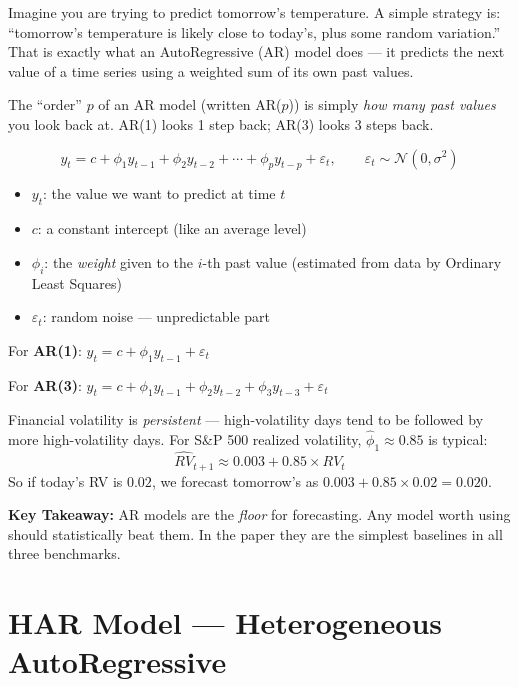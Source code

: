 \documentclass[11pt]{article}
\newcommand{\concept}[2]{%
  \begin{tcolorbox}[conceptbox, title={#1}]
  #2
  \end{tcolorbox}
}
\newcommand{\mathblock}[2]{%
  \begin{tcolorbox}[mathbox, title={Math: #1}]
  #2
  \end{tcolorbox}
}
\newcommand{\example}[2]{%
  \begin{tcolorbox}[examplebox, title={Concrete Example: #1}]
  #2
  \end{tcolorbox}
}
\newcommand{\keypoint}[1]{%
  \begin{tcolorbox}[keybox]
  \textbf{Key Takeaway:} #1
  \end{tcolorbox}
}
\begin{document}
\concept{What is an AutoRegressive Model?}{
Imagine you are trying to predict tomorrow's temperature. A simple strategy is:
``tomorrow's temperature is likely close to today's, plus some random variation.''
That is exactly what an AutoRegressive (AR) model does --- it predicts the next
value of a time series using a weighted sum of its own past values.

The ``order'' $p$ of an AR model (written AR($p$)) is simply \emph{how many
past values} you look back at. AR(1) looks 1 step back; AR(3) looks 3 steps
back.
}

\mathblock{AR($p$) Formula}{
\[
  y_t = c + \phi_1 y_{t-1} + \phi_2 y_{t-2} + \cdots + \phi_p y_{t-p}
        + \varepsilon_t, \qquad \varepsilon_t \sim \mathcal{N}(0, \sigma^2)
\]
\begin{itemize}
  \item $y_t$: the value we want to predict at time $t$
  \item $c$: a constant intercept (like an average level)
  \item $\phi_i$: the \emph{weight} given to the $i$-th past value
        (estimated from data by Ordinary Least Squares)
  \item $\varepsilon_t$: random noise --- unpredictable part
\end{itemize}

For \textbf{AR(1)}: $y_t = c + \phi_1 y_{t-1} + \varepsilon_t$

For \textbf{AR(3)}: $y_t = c + \phi_1 y_{t-1} + \phi_2 y_{t-2}
                              + \phi_3 y_{t-3} + \varepsilon_t$
}

\example{Volatility Persistence}{
Financial volatility is \emph{persistent} --- high-volatility days tend to be
followed by more high-volatility days. For S\&P 500 realized volatility,
$\hat\phi_1 \approx 0.85$ is typical:
\[
  \widehat{RV}_{t+1} \approx 0.003 + 0.85 \times RV_t
\]
So if today's RV is $0.02$, we forecast tomorrow's as
$0.003 + 0.85 \times 0.02 = 0.020$.
}

\keypoint{AR models are the \emph{floor} for forecasting. Any model worth
using should statistically beat them. In the paper they are the simplest
baselines in all three benchmarks.}

\section{HAR Model --- Heterogeneous AutoRegressive}
\end{document}
